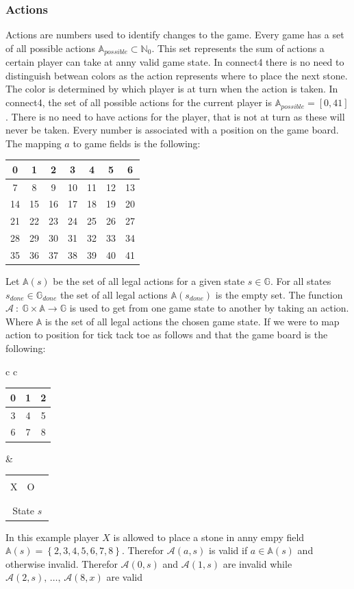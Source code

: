 \documentclass[12pt]{article}
\newcommand{\tickTackToe}[9]{
\begin{tabular}{p{7px}|p{7px}|p{7px}}
\multicolumn{3}{c}{}\\
  #1 & #2 & #3 \\      \hline
  #4 & #5 & #6 \\      \hline
   & #7 & #8\\
\multicolumn{3}{c}{#9}
\end{tabular}
}
\begin{document}
\subsubsection{Actions}
Actions are numbers used to identify changes to the game. Every game has a set of all possible actions \(\mathbb{A}_{possible} \subset \mathbb{N}_0\). This set represents the sum of actions  a certain player can take at anny valid game state.  In connect4 there is no need to distinguish betwean colors as the action represents where to place the next stone. The color is determined by which player is at turn when the action is taken. In connect4, the set of all possible actions for the current player is \(\mathbb{A}_{possible} = [0, 41]\). There is no need to have actions for the player, that is not at turn as these will never be taken. Every number is associated with a position on the game board. The mapping \(a\) to game fields is the following:
\begin{center}
\begin{tabular}{| c | c | c | c | c | c | c |}
 \hline
0 & 1 & 2 & 3 & 4 & 5 & 6  \\\hline
7 & 8 & 9 & 10 & 11 & 12 & 13\\\hline
14 & 15 & 16 & 17 & 18 & 19 & 20 \\\hline
21 & 22 & 23& 24 & 25 & 26 & 27 \\\hline
28 & 29 & 30 & 31 & 32 & 33 & 34 \\\hline
35 & 36 & 37 & 38 & 39 & 40 & 41 \\\hline
\end{tabular}
\end{center}
Let \(\mathbb{A}(s)\) be the set of all legal actions for a given state  \(s \in \mathbb{G}\). For all states \(s_{done} \in \mathbb{G}_{done}\) the set of all legal actions \(\mathbb{A}(s_{done})\) is the empty set. The function \(\mathcal{A}~:~\mathbb{G}\times\mathbb{A}\to\mathbb{G}\) is used to get from one game state to another by taking an action. Where \(\mathbb A\) is the set of all legal actions the chosen game state. If we were to map action to position for tick tack toe as follows and that the game board is the following:
\begin{center}\begin{tabular} { c c }
\begin{tabular}{| c | c | c |}
 \hline
 0 & 1 & 2 \\\hline
 3 & 4 & 5 \\\hline
 6 & 7 & 8 \\\hline
\end{tabular} & \tickTackToe{X}{O}{}{}{}{}{}{}{State \(s\)}
\end{tabular}\end{center}
In this example player \(X\) is allowed to place a stone in anny empy field \(\mathbb A(s) = \left\{ 2, 3, 4, 5, 6, 7, 8 \right\}\). Therefor \(\mathcal A(a, s)\) is valid if \(a \in \mathbb A(s)\) and otherwise invalid. Therefor \(\mathcal A(0, s)\) and \(\mathcal A(1, s)\) are invalid while  \(\mathcal A(2, s),\,\dots,\,\mathcal A(8, x)\) are valid
\end{document}
